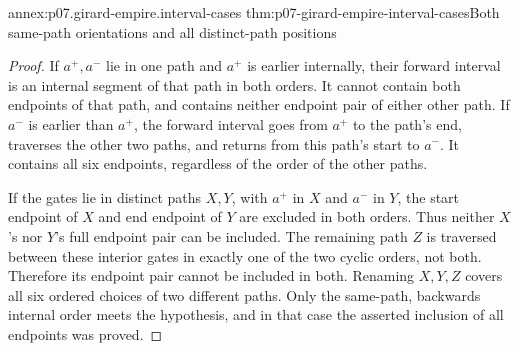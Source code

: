 \begin{annexitem}{annex:p07.girard-empire.interval-cases}
 {thm:p07-girard-empire-interval-cases}{Both same-path orientations and all distinct-path positions}
\begin{proof}
If \(a^+,a^-\) lie in one path and \(a^+\) is earlier internally,
their forward interval is an internal segment of that path in both
orders. It cannot contain both endpoints of that path, and contains
neither endpoint pair of either other path.
If \(a^-\) is earlier than \(a^+\), the forward interval goes from
\(a^+\) to the path's end, traverses the other two paths, and returns
from this path's start to \(a^-\). It contains all six endpoints,
regardless of the order of the other paths.

If the gates lie in distinct paths \(X,Y\), with \(a^+\) in \(X\)
and \(a^-\) in \(Y\), the start endpoint of \(X\) and end endpoint
of \(Y\) are excluded in both orders. Thus neither \(X\)'s nor
\(Y\)'s full endpoint pair can be included.
The remaining path \(Z\) is traversed between these interior gates
in exactly one of the two cyclic orders, not both. Therefore its
endpoint pair cannot be included in both. Renaming \(X,Y,Z\)
covers all six ordered choices of two different paths.
Only the same-path, backwards internal order meets the hypothesis,
and in that case the asserted inclusion of all endpoints was proved.
\end{proof}
\end{annexitem}

